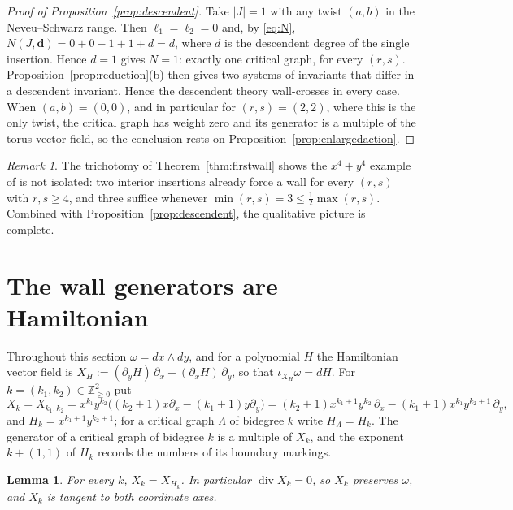 \documentclass[11pt]{amsart}
\newtheorem{lemma}[theorem]{Lemma}
\theoremstyle{definition}
\theoremstyle{remark}
\newtheorem{remark}[theorem]{Remark}
\newcommand{\ZZ}{\mathbb{Z}}
\begin{document}
\begin{proof}[Proof of Proposition~\ref{prop:descendent}]
Take $|J|=1$ with any twist $(a,b)$ in the Neveu--Schwarz range. Then
$\ell_{1}=\ell_{2}=0$ and, by \eqref{eq:N},
$N(J,\mathbf d)=0+0-1+1+d=d$, where $d$ is the descendent degree of the single
insertion. Hence $d=1$ gives $N=1$: exactly one critical graph, for every
$(r,s)$. Proposition~\ref{prop:reduction}(b) then gives two systems of invariants
that differ in a descendent invariant. Hence the descendent theory
wall-crosses in every case.  When $(a,b)=(0,0)$, and in particular for
$(r,s)=(2,2)$, where this is the only twist, the critical graph has weight zero
and its generator is a multiple of the torus vector field, so the conclusion
rests on Proposition~\ref{prop:enlargedaction}.
\end{proof}

\begin{remark}
The trichotomy of Theorem~\ref{thm:firstwall} shows the $x^{4}+y^{4}$ example of
\cite{GKTsurvey} is not isolated: two interior insertions already force a wall
for every $(r,s)$ with $r,s\geq4$, and three suffice whenever
$\min(r,s)=3\leq\frac12\max(r,s)$. Combined with
Proposition~\ref{prop:descendent}, the qualitative picture is complete.
\end{remark}

\section{The wall generators are Hamiltonian}
\label{sec:hamiltonian}

Throughout this section $\omega=dx\wedge dy$, and for a polynomial $H$ the
Hamiltonian vector field is
$X_{H}:=(\partial_{y}H)\,\partial_{x}-(\partial_{x}H)\,\partial_{y}$, so that
$\iota_{X_{H}}\omega=dH$.  For $k=(k_1,k_2)\in\ZZ^2_{\ge0}$ put
\begin{equation}
\label{eq:Xab}
X_{k}=X_{k_1,k_2}=x^{k_1}y^{k_2}\bigl((k_2+1)x\partial_{x}-(k_1+1)y\partial_{y}\bigr)
=(k_2+1)x^{k_1+1}y^{k_2}\,\partial_{x}-(k_1+1)x^{k_1}y^{k_2+1}\,\partial_{y},
\end{equation}
and $H_k=x^{k_1+1}y^{k_2+1}$; for a critical graph $\Lambda$ of bidegree $k$ write
$H_\Lambda=H_k$.  The generator of a critical graph of bidegree
$k$ is a multiple of $X_k$, and the exponent $k+(1,1)$ of $H_k$ records the
numbers of its boundary markings.

\begin{lemma}
\label{lem:hamvf}
For every $k$, $X_{k}=X_{H_{k}}$.  In particular $\operatorname{div}X_{k}=0$,
so $X_{k}$ preserves $\omega$, and $X_k$ is tangent to both coordinate axes.
\end{lemma}
\end{document}
